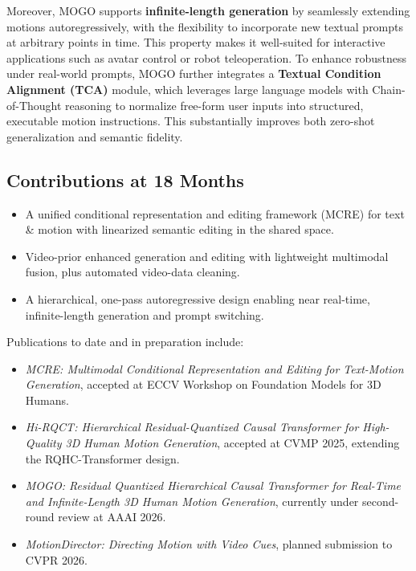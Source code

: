 \documentclass[a4paper,12pt]{article}
\begin{document}
Moreover, MOGO supports \textbf{infinite-length generation} by seamlessly extending motions autoregressively, with the flexibility to incorporate new textual prompts at arbitrary points in time. This property makes it well-suited for interactive applications such as avatar control or robot teleoperation. To enhance robustness under real-world prompts, MOGO further integrates a \textbf{Textual Condition Alignment (TCA)} module, which leverages large language models with Chain-of-Thought reasoning to normalize free-form user inputs into structured, executable motion instructions. This substantially improves both zero-shot generalization and semantic fidelity.



\subsection{Contributions at 18 Months}
\begin{itemize}[leftmargin=1.2em]
    \item A unified conditional representation and editing framework (MCRE) for text \& motion with linearized semantic editing in the shared space.
    \item Video-prior enhanced generation and editing with lightweight multimodal fusion, plus automated video-data cleaning.
    \item A hierarchical, one-pass autoregressive design enabling near real-time, infinite-length generation and prompt switching.
\end{itemize}

\noindent Publications to date and in preparation include:
\begin{itemize}
    \item \textit{MCRE: Multimodal Conditional Representation and Editing for Text-Motion Generation}, accepted at ECCV Workshop on Foundation Models for 3D Humans.
    \item \textit{Hi-RQCT: Hierarchical Residual-Quantized Causal Transformer for High-Quality 3D Human Motion Generation}, accepted at CVMP 2025, extending the RQHC-Transformer design.
    \item \textit{MOGO: Residual Quantized Hierarchical Causal Transformer for Real-Time and Infinite-Length 3D Human Motion Generation}, currently under second-round review at AAAI 2026.
    \item \textit{MotionDirector: Directing Motion with Video Cues}, planned submission to CVPR 2026.
\end{itemize}
\end{document}
